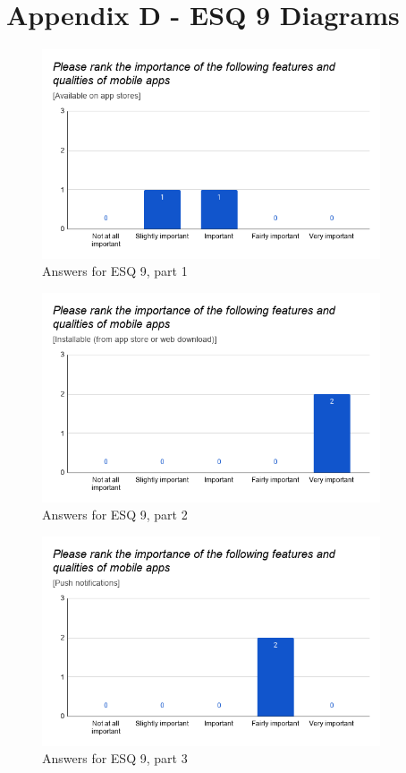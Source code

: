 \documentclass[a4paper,12pt]{article}
\begin{document}
\newpage

\section{Appendix D - ESQ 9 Diagrams}
\label{Appendix_eduMultiDiagrams}

\begin{figure}[ht!]
    \centering
    \includegraphics[width=10cm]{img/Results/esq9_1.png}
    \caption{Answers for ESQ 9, part 1}
    \label{fig:res_eduq9_1}
\end{figure}

\begin{figure}[ht!]
    \centering
    \includegraphics[width=10cm]{img/Results/esq9_2.png}
    \caption{Answers for ESQ 9, part 2}
    \label{fig:res_eduq9_2}
\end{figure}

\begin{figure}[ht!]
    \centering
    \includegraphics[width=10cm]{img/Results/esq9_3.png}
    \caption{Answers for ESQ 9, part 3}
    \label{fig:res_eduq9_3}
\end{figure}
\end{document}

